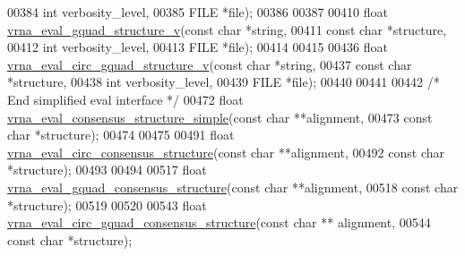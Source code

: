 \begin{DoxyCode}
00384                                  \textcolor{keywordtype}{int}        verbosity\_level,
00385                                  FILE       *file);
00386 
00387 
00410 \textcolor{keywordtype}{float} \hyperlink{group__eval_gaeaa2bdbc1b5d78c667e735fbdff87fff}{vrna\_eval\_gquad\_structure\_v}(\textcolor{keyword}{const} \textcolor{keywordtype}{char}  *\textcolor{keywordtype}{string},
00411                                   \textcolor{keyword}{const} \textcolor{keywordtype}{char}  *structure,
00412                                   \textcolor{keywordtype}{int}         verbosity\_level,
00413                                   FILE        *file);
00414 
00415 
00436 \textcolor{keywordtype}{float} \hyperlink{group__eval_gab96a6c59923ff06c35f8c2fd2c239727}{vrna\_eval\_circ\_gquad\_structure\_v}(\textcolor{keyword}{const} \textcolor{keywordtype}{char} *\textcolor{keywordtype}{string},
00437                                        \textcolor{keyword}{const} \textcolor{keywordtype}{char} *structure,
00438                                        \textcolor{keywordtype}{int}        verbosity\_level,
00439                                        FILE       *file);
00440 
00441 
00442 \textcolor{comment}{/* End simplified eval interface */}
00472 \textcolor{keywordtype}{float} \hyperlink{group__eval_ga7762c3a7bdcbc3a14ef93259d322c7d6}{vrna\_eval\_consensus\_structure\_simple}(\textcolor{keyword}{const} \textcolor{keywordtype}{char} **alignment,
00473                                            \textcolor{keyword}{const} \textcolor{keywordtype}{char} *structure);
00474 
00475 
00491 \textcolor{keywordtype}{float} \hyperlink{group__eval_gac96577cf232c71160f762737a994b7c6}{vrna\_eval\_circ\_consensus\_structure}(\textcolor{keyword}{const} \textcolor{keywordtype}{char} **alignment,
00492                                          \textcolor{keyword}{const} \textcolor{keywordtype}{char} *structure);
00493 
00494 
00517 \textcolor{keywordtype}{float} \hyperlink{group__eval_gaf09a326b3d57a4b30c27bd0e216198ac}{vrna\_eval\_gquad\_consensus\_structure}(\textcolor{keyword}{const} \textcolor{keywordtype}{char}  **alignment,
00518                                           \textcolor{keyword}{const} \textcolor{keywordtype}{char}  *structure);
00519 
00520 
00543 \textcolor{keywordtype}{float} \hyperlink{group__eval_gac673ebb9ae2a29f54d201e2ac5b85540}{vrna\_eval\_circ\_gquad\_consensus\_structure}(\textcolor{keyword}{const} \textcolor{keywordtype}{char} **
      alignment,
00544                                                \textcolor{keyword}{const} \textcolor{keywordtype}{char} *structure);

\end{DoxyCode}
